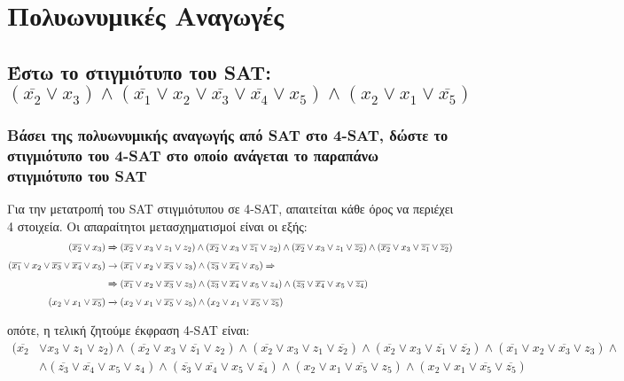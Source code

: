 \section{Πολυωνυμικές Αναγωγές}

\subsection{Έστω το στιγμιότυπο του SAT: $(\overline{x_2} \lor x_3) \wedge (\overline{x_1} \lor x_2 \lor \overline{x_3} \lor \overline{x_4} \lor x_5) \wedge (x_2 \lor x_1 \lor \overline{x_5})$}

\subsubsection{Βάσει της πολυωνυμικής αναγωγής από SAT στο 4-SAT, δώστε το στιγμιότυπο του 4-SAT στο οποίο ανάγεται το παραπάνω στιγμιότυπο του SAT}

Για την μετατροπή του SAT στιγμιότυπου σε 4-SAT, απαιτείται κάθε όρος να περιέχει 4 στοιχεία. Οι απαραίτητοι μετασχηματισμοί είναι οι εξής: 
\begin{align}
	(\overline{x_2} \lor x_3) &\xRightarrow{} (\overline{x_2} \lor x_3 \lor z_1 \lor z_2) \wedge (\overline{x_2} \lor x_3 \lor \overline{z_1} \lor z_2) \wedge (\overline{x_2} \lor x_3 \lor z_1 \lor \overline{z_2}) \wedge (\overline{x_2} \lor x_3 \lor \overline{z_1} \lor \overline{z_2})\\
	(\overline{x_1} \lor x_2 \lor \overline{x_3} \lor \overline{x_4} \lor x_5) &\xrightarrow{} (\overline{x_1} \lor x_2 \lor \overline{x_3} \lor z_3) \wedge (\overline{z_3} \lor \overline{x_4} \lor x_5) \xRightarrow{} \notag\\
												&\xRightarrow{} (\overline{x_1} \lor x_2 \lor \overline{x_3} \lor z_3) \wedge (\overline{z_3} \lor \overline{x_4} \lor x_5 \lor z_4) \wedge (\overline{z_3} \lor \overline{x_4} \lor x_5 \lor \overline{z_4})\\
	(x_2 \lor x_1 \lor \overline{x_5}) &\xrightarrow{} (x_2 \lor x_1 \lor \overline{x_5} \lor z_5) \wedge (x_2 \lor x_1 \lor \overline{x_5} \lor \overline{z_5})
\end{align}

οπότε, η τελική ζητούμε έκφραση 4-SAT είναι:
\begin{align*}
	(\overline{x_2} &\lor x_3 \lor z_1 \lor z_2)   \wedge   (\overline{x_2} \lor x_3 \lor \overline{z_1} \lor z_2)   \wedge   (\overline{x_2} \lor x_3 \lor z_1 \lor \overline{z_2}) \wedge   (\overline{x_2} \lor x_3 \lor \overline{z_1} \lor \overline{z_2})   \wedge   (\overline{x_1} \lor x_2 \lor \overline{x_3} \lor z_3) \wedge \\&\wedge (\overline{z_3} \lor \overline{x_4} \lor x_5 \lor z_4) \wedge (\overline{z_3} \lor \overline{x_4} \lor x_5 \lor \overline{z_4}) \wedge (x_2 \lor x_1 \lor \overline{x_5} \lor z_5) \wedge (x_2 \lor x_1 \lor \overline{x_5} \lor \overline{z_5})
\end{align*}
\noindent\\
